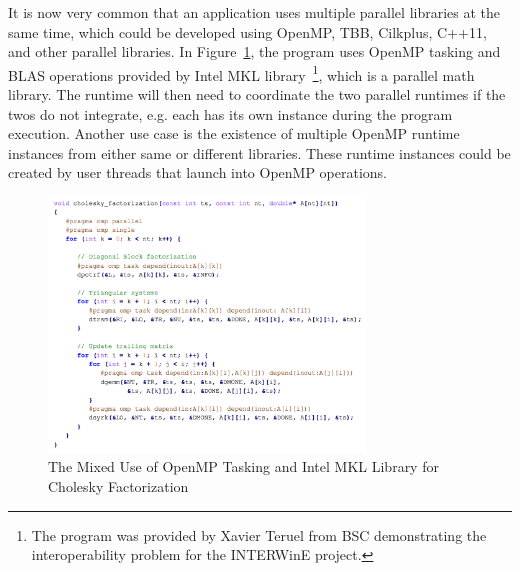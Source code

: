 It is now very common that an application uses multiple parallel libraries at the same time, which could be developed 
using OpenMP, TBB, Cilkplus, C++11, and other parallel libraries. In Figure~\ref{fig:cholesky}, the program uses OpenMP 
tasking and BLAS operations provided by Intel MKL library~\footnote{The program was provided by Xavier Teruel from BSC demonstrating the interoperability problem for the INTERWinE project.}, which is a parallel math library. The runtime will then need to coordinate the two
parallel runtimes if the twos do not integrate, e.g. each has its own instance during the program execution. Another use case is the existence of multiple OpenMP runtime instances from either same or different libraries. These runtime instances could be created by user threads that launch into
OpenMP operations. 
\begin{figure}[h!]
  \centering
      \includegraphics[width=0.75\textwidth]{images/cholesky}
      \caption{The Mixed Use of OpenMP Tasking and Intel MKL Library for Cholesky Factorization~\cite{intertwine}}
 \label{fig:cholesky}
\end{figure}
